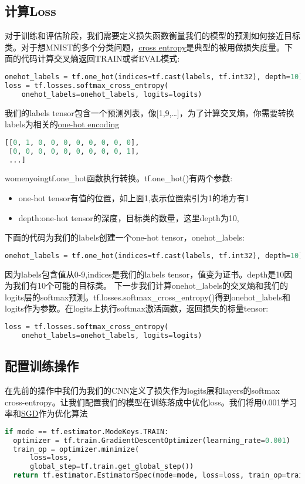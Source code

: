 \subsection{计算Loss}
对于训练和评估阶段，我们需要定义损失函数衡量我们的模型的预测如何接近目标类。对于想MNIST的多个分类问题，\href{https://en.wikipedia.org/wiki/Cross_entropy}{cross entropy}是典型的被用做损失度量。下面的代码计算交叉熵返回TRAIN或者EVAL模式:
\begin{lstlisting}[language=Python]
onehot_labels = tf.one_hot(indices=tf.cast(labels, tf.int32), depth=10)
loss = tf.losses.softmax_cross_entropy(
    onehot_labels=onehot_labels, logits=logits)
\end{lstlisting}
我们的labels tensor包含一个预测列表，像[1,9,\ldots]，为了计算交叉熵，你需要转换labels为相关的\href{https://www.quora.com/What-is-one-hot-encoding-and-when-is-it-used-in-data-science}{one-hot encoding}
\begin{lstlisting}[language=Python]
[[0, 1, 0, 0, 0, 0, 0, 0, 0, 0],
 [0, 0, 0, 0, 0, 0, 0, 0, 0, 1],
 ...]
\end{lstlisting}
womenyoingtf.one\_hot函数执行转换。tf.one\_hot()有两个参数:
\begin{itemize}
\item one-hot tensor有值的位置，如上面1,表示位置索引为1的地方有1
\item depth:one-hot tensor的深度，目标类的数量，这里depth为10,
\end{itemize}
下面的代码为我们的labels创建一个one-hot tensor，onehot\_labels:
\begin{lstlisting}[language=Python]
onehot_labels = tf.one_hot(indices=tf.cast(labels, tf.int32), depth=10)
\end{lstlisting}
因为labels包含值从0-9,indices是我们的labels tensor，值变为证书。depth是10因为我们有10个可能的目标类。
下一步我们计算onehot\_labels的交叉熵和我们的logits层的softmax预测。tf.losses.softmax\_cross\_entropy()得到onehot\_labels和logits作为参数。在logits上执行softmax激活函数，返回损失的标量tensor:
\begin{lstlisting}[language=Python]
loss = tf.losses.softmax_cross_entropy(
    onehot_labels=onehot_labels, logits=logits)
\end{lstlisting}
\subsection{配置训练操作}
在先前的操作中我们为我们的CNN定义了损失作为logits层和layers的softmax cross-entropy。让我们配置我们的模型在训练落成中优化loss。我们将用0.001学习率和\href{https://en.wikipedia.org/wiki/Stochastic_gradient_descent}{SGD}作为优化算法\begin{lstlisting}[language=Python]
if mode == tf.estimator.ModeKeys.TRAIN:
  optimizer = tf.train.GradientDescentOptimizer(learning_rate=0.001)
  train_op = optimizer.minimize(
      loss=loss,
      global_step=tf.train.get_global_step())
  return tf.estimator.EstimatorSpec(mode=mode, loss=loss, train_op=train_op)

\end{lstlisting}
